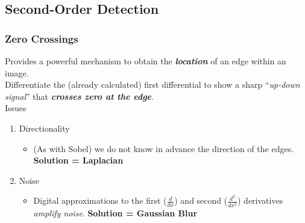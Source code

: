 \documentclass[english, 10pt]{article}
\begin{document}
\subsection{Second-Order Detection}

%


\subsubsection{Zero Crossings}

  Provides a powerful mechanism to obtain the \textbf{\emph{location}}
  of an edge within an image.\\
  
  Differentiate the (already calculated) first differential to show a
  sharp ``\emph{up-down signal}'' that \textbf{\emph{crosses zero at the
  edge}}.\\
  
  Issues

  \begin{enumerate}
  \def\labelenumi{\arabic{enumi}.}
  \itemsep1pt\parskip0pt
  \item
    Directionality

    \begin{itemize}
    \itemsep1pt\parskip0pt
    \item
      (As with Sobel) we do not know in advance the direction of the
      edges. \textbf{Solution = Laplacian}
    \end{itemize}
  \item
    Noise

    \begin{itemize}
    \itemsep1pt\parskip0pt
    \item
      Digital approximations to the first ($\frac{d}{dx}$) and second
      ($\frac{d^2}{dx^2}$) derivatives \emph{amplify noise}. \textbf{Solution = Gaussian Blur}
    \end{itemize}
  \end{enumerate}
\end{document}
